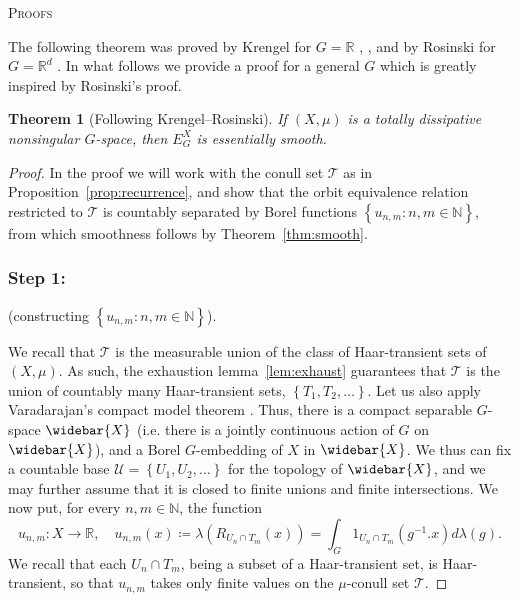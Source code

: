 \documentclass{amsart}
\numberwithin{equation}{subsection}
\newtheorem{thm}{Theorem}[section]
\newcommand{\ssection}[1]{%
  \par
  \vspace{0.7\baselineskip}%
  {\normalfont\scshape\centering #1\par}%
  \vspace{0.5\baselineskip}%
}
\begin{document}
\ssection{Proofs}

The following theorem was proved by Krengel for \(G=\mathbb{R}\) \cite[Satz 3.1]{krengel1968I}, \cite[Satz 4.2]{krengel1969II}, and by Rosinski for \(G=\mathbb{R}^{d}\) \cite[Theorem 2.2]{rosinski2000decomposition}. In what follows we provide a proof for a general \(G\) which is greatly inspired by Rosinski's proof.

\begin{thm}[Following Krengel--Rosinski]
\label{thm:disssmooth}
If \(\left(X,\mu\right)\) is a totally dissipative nonsingular \(G\)-space, then \(E_{G}^{X}\) is essentially smooth.
\end{thm}

\begin{proof}
In the proof we will work with the conull set \(\mathcal{T}\) as in Proposition~\ref{prop:recurrence}, and show that the orbit equivalence relation restricted to \(\mathcal{T}\) is countably separated by Borel functions \(\left\{u_{n,m}:n,m\in\mathbb{N}\right\}\), from which smoothness follows by Theorem~\ref{thm:smooth}.

\subsubsection*{Step 1:} (constructing \(\left\{u_{n,m}:n,m\in\mathbb{N}\right\}\)).

We recall that \(\mathcal{T}\) is the measurable union of the class of Haar-transient sets of \(\left(X,\mu\right)\). As such, the exhaustion lemma~\ref{lem:exhaust} guarantees that \(\mathcal{T}\) is the union of countably many Haar-transient sets, \(\left\{T_{1},T_{2},\dotsc\right\}\). Let us also apply Varadarajan's compact model theorem \cite[Theorem 5.7, p. 160]{varadarajan1968geometry}. Thus, there is a compact separable \(G\)-space \(\widebar{X}\) (i.e. there is a jointly continuous action of \(G\) on \(\widebar{X}\)), and a Borel \(G\)-embedding of \(X\) in \(\widebar{X}\). We thus can fix a countable base \(\mathcal{U}=\left\{U_{1},U_{2},\dotsc\right\}\) for the topology of \(\widebar{X}\), and we may further assume that it is closed to finite unions and finite intersections. We now put, for every \(n,m\in\mathbb{N}\), the function
\[u_{n,m}:X\to\mathbb{R},\quad u_{n,m}\left(x\right)\coloneqq \lambda\left(R_{U_{n}\cap T_{m}}\left(x\right)\right)=\int_{G}1_{U_{n}\cap T_{m}}\left(g^{-1}.x\right)d\lambda\left(g\right).\]
We recall that each \(U_{n}\cap T_{m}\), being a subset of a Haar-transient set, is Haar-transient, so that \(u_{n,m}\) takes only finite values on the \(\mu\)-conull set \(\mathcal{T}\).


\end{proof}
\end{document}
